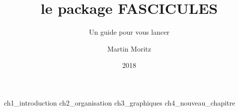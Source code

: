 \documentclass[11pt,a4paper,twoside,french]{scrbook} %
\title{le package  FASCICULES}
\subtitle{Un guide pour vous lancer}
\author{Martin Moritz}
\date{2018}
\begin{document}
\fasciculestitle
\tableofcontents


{ch1_introduction}
{ch2_organisation}
{ch3_graphiques}
{ch4_nouveau_chapitre}

\newpage
\end{document}
